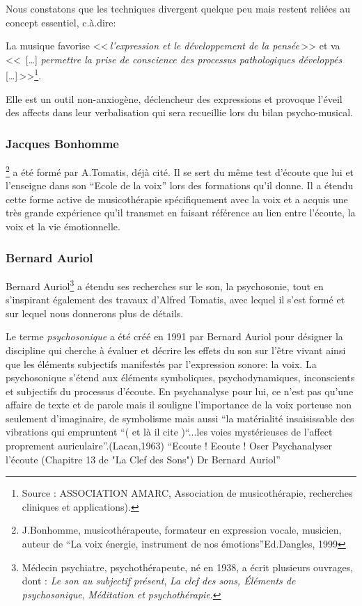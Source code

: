 Nous constatons que les techniques divergent quelque peu mais restent
reliées au concept essentiel, c.à.dire: 

La musique favorise  <<\,\emph{l'expression et le développement
	de la pensée}\,>> et  va <<\, [\ldots] \emph{permettre la prise de conscience des processus pathologiques développés} [\ldots]\,>>\footnote{Source : ASSOCIATION AMARC,
  Association de musicothérapie, recherches cliniques et
  applications). }.

Elle est un outil non-anxiogène, déclencheur des expressions et provoque
l'éveil des affects dans  leur verbalisation qui sera recueillie lors
du bilan psycho-musical.
 
  \subsubsection{Jacques Bonhomme} \footnote{J.Bonhomme, musicothérapeute, formateur 
  	en expression vocale, musicien, auteur de ``La voix énergie,
        instrument de nos émotions''Ed.Dangles, 1999}  a 
      été formé par A.Tomatis, déjà cité. Il se sert du même test d'écoute
      que lui et l'enseigne dans son ``Ecole de la voix'' lors des
      formations qu'il donne. Il a étendu cette  forme active de musicothérapie
      spécifiquement avec la voix 
     et a acquis une
      très grande expérience qu'il transmet en   
      faisant référence au lien entre l'écoute, la voix et la vie émotionnelle.

 \subsubsection{Bernard Auriol}

Bernard Auriol\footnote{Médecin psychiatre, psychothérapeute, 
	né en 1938, a écrit plusieurs ouvrages, dont : \textsl{Le son au subjectif présent}, \textsl{La clef des sons, Éléments de psychosonique}, \textsl{Méditation et
  psychothérapie}.}
a étendu ses recherches sur le son, la psychosonie, 
tout en s'inspirant également des
travaux d'Alfred Tomatis, avec lequel il s'est formé et sur lequel
nous donnerons plus de détails.

Le terme \emph{psychosonique} a été créé en 1991 par Bernard Auriol pour
désigner la discipline qui cherche à évaluer et décrire les effets du
son sur l'être vivant ainsi que les éléments
subjectifs manifestés par l'expression sonore:  la
voix. 
La psychosonique s'étend aux éléments
symboliques, psychodynamiques, inconscients et subjectifs du processus
d'écoute. En psychanalyse pour lui, ce n'est pas qu'une affaire de
texte et de parole mais il souligne l'importance de la voix porteuse non seulement
d'imaginaire, de symbolisme mais aussi ``la matérialité insaisissable
des vibrations qui empruntent ``( et là il cite )``...les voies mystérieuses de
l'affect proprement auriculaire''.(Lacan,1963)
``Ecoute ! Ecoute !
Oser Psychanalyser l'écoute
(Chapitre 13 de "La Clef des Sons")
Dr Bernard Auriol''



